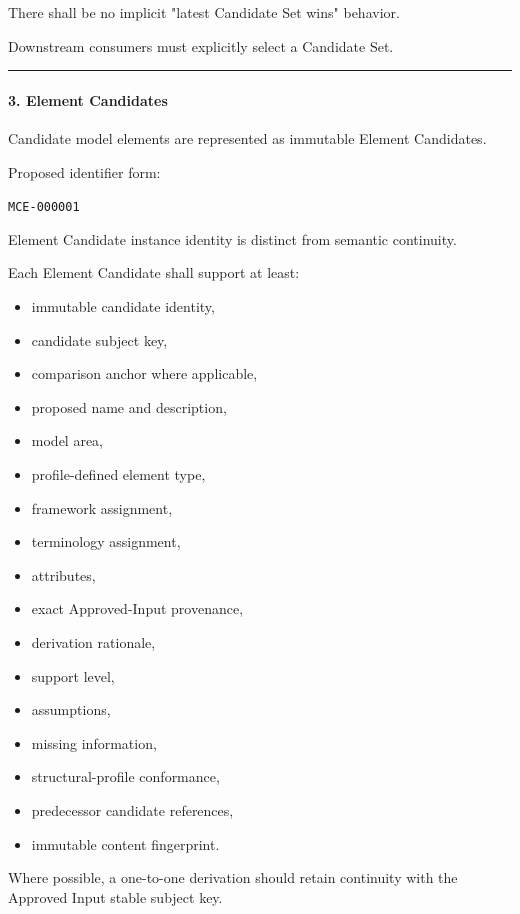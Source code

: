 There shall be no implicit "latest Candidate Set wins" behavior.

Downstream consumers must explicitly select a Candidate Set.

\begin{center}\rule{0.5\linewidth}{0.5pt}\end{center}

\hypertarget{3-element-candidates}{%
\paragraph{3. Element Candidates}\label{3-element-candidates}}

Candidate model elements are represented as immutable Element Candidates.

Proposed identifier form:

\texttt{MCE-000001}

Element Candidate instance identity is distinct from semantic continuity.

Each Element Candidate shall support at least:

\begin{itemize}
\tightlist
\item
  immutable candidate identity,
\item
  candidate subject key,
\item
  comparison anchor where applicable,
\item
  proposed name and description,
\item
  model area,
\item
  profile-defined element type,
\item
  framework assignment,
\item
  terminology assignment,
\item
  attributes,
\item
  exact Approved-Input provenance,
\item
  derivation rationale,
\item
  support level,
\item
  assumptions,
\item
  missing information,
\item
  structural-profile conformance,
\item
  predecessor candidate references,
\item
  immutable content fingerprint.
\end{itemize}

Where possible, a one-to-one derivation should retain continuity with the Approved Input stable subject key.

